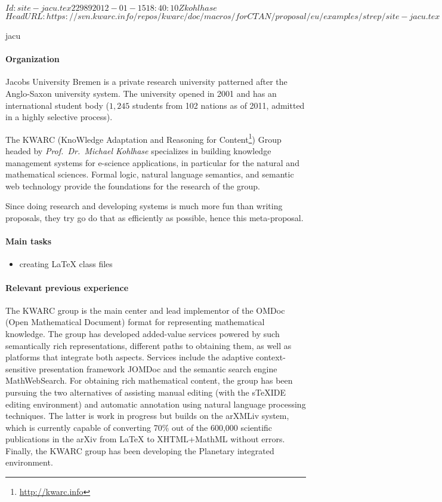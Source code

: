 \svnInfo $Id: site-jacu.tex 22989 2012-01-15 18:40:10Z kohlhase $
\svnKeyword $HeadURL: https://svn.kwarc.info/repos/kwarc/doc/macros/forCTAN/proposal/eu/examples/strep/site-jacu.tex $
\begin{sitedescription}{jacu}

\paragraph{Organization} Jacobs University Bremen is a private research university patterned
after the Anglo-Saxon university system.  The university opened in
2001 and has an international student body ($1,245$ students from 102
nations as of 2011, admitted in a highly selective process).

The KWARC (KnoWledge Adaptation and Reasoning for
Content\footnote{\url{http://kwarc.info}}) Group headed by
{\emph{Prof.\ Dr.\ Michael Kohlhase}} specializes in building
knowledge management systems for e-science applications, in particular
for the natural and mathematical sciences.  Formal logic, natural
language semantics, and semantic web technology provide the
foundations for the research of the group.
  
  Since doing research and developing systems is much more fun than writing proposals,
  they try go do that as efficiently as possible, hence this meta-proposal. 

\paragraph{Main tasks}

\begin{itemize}
\item creating {\LaTeX} class files
\end{itemize}

\paragraph{Relevant previous experience}

The KWARC group is the main center and lead implementor of the OMDoc
(Open Mathematical Document) format for representing mathematical
knowledge.  The group has developed added-value services powered by such semantically rich representations, different paths to obtaining them, as well as platforms that integrate both aspects.  Services include the adaptive context-sensitive presentation framework JOMDoc and the semantic search engine MathWebSearch.  For obtaining rich mathematical content, the group has been pursuing the two alternatives of assisting manual editing (with the sTeXIDE editing environment) and automatic annotation using natural language processing techniques.  The latter is work in progress but builds on the arXMLiv system, which is currently capable of converting 70\% out of the 600,000 scientific publications in the arXiv from {\LaTeX} to XHTML+MathML without errors.  Finally, the KWARC group has been developing the Planetary integrated environment.


\end{sitedescription}

